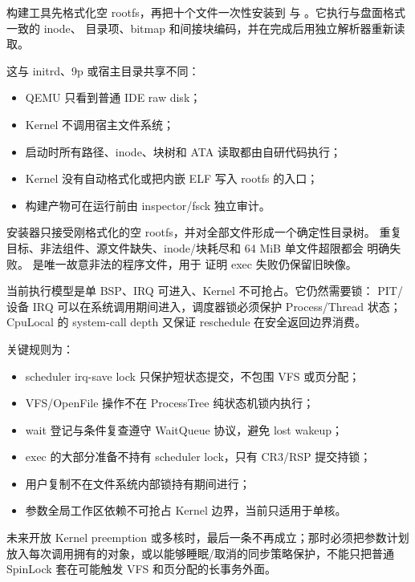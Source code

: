 构建工具先格式化空 rootfs，再把十个文件一次性安装到
 与 。它执行与盘面格式一致的 inode、
目录项、bitmap 和间接块编码，并在完成后用独立解析器重新读取。

这与 initrd、9p 或宿主目录共享不同：

\begin{itemize}
  \item QEMU 只看到普通 IDE raw disk；
  \item Kernel 不调用宿主文件系统；
  \item 启动时所有路径、inode、块树和 ATA 读取都由自研代码执行；
  \item Kernel 没有自动格式化或把内嵌 ELF 写入 rootfs 的入口；
  \item 构建产物可在运行前由 inspector/fsck 独立审计。
\end{itemize}

安装器只接受刚格式化的空 rootfs，并对全部文件形成一个确定性目录树。
重复目标、非法组件、源文件缺失、inode/块耗尽和 64 MiB 单文件超限都会
明确失败。 是唯一故意非法的程序文件，用于
证明 exec 失败仍保留旧映像。

当前执行模型是单 BSP、IRQ 可进入、Kernel 不可抢占。它仍然需要锁：
PIT/设备 IRQ 可以在系统调用期间进入，调度器锁必须保护 Process/Thread
状态；CpuLocal 的 system-call depth 又保证 reschedule 在安全返回边界消费。

关键规则为：

\begin{itemize}
  \item scheduler irq-save lock 只保护短状态提交，不包围 VFS 或页分配；
  \item VFS/OpenFile 操作不在 ProcessTree 纯状态机锁内执行；
  \item wait 登记与条件复查遵守 WaitQueue 协议，避免 lost wakeup；
  \item exec 的大部分准备不持有 scheduler lock，只有 CR3/RSP 提交持锁；
  \item 用户复制不在文件系统内部锁持有期间进行；
  \item 参数全局工作区依赖不可抢占 Kernel 边界，当前只适用于单核。
\end{itemize}

未来开放 Kernel preemption 或多核时，最后一条不再成立；那时必须把参数计划
放入每次调用拥有的对象，或以能够睡眠/取消的同步策略保护，不能只把普通
SpinLock 套在可能触发 VFS 和页分配的长事务外面。

